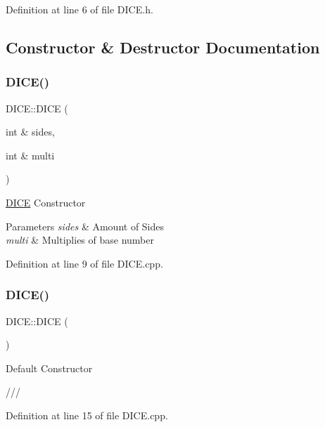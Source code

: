 Definition at line 6 of file D\+I\+C\+E.\+h.



\subsection{Constructor \& Destructor Documentation}
\mbox{\label{class_d_i_c_e_a5b7f251c8cddf1dd2a69bd676d8558fc}} 
\subsubsection{\texorpdfstring{DICE()}{DICE()}\hspace{0.1cm}{\footnotesize\ttfamily [1/2]}}
{\footnotesize\ttfamily D\+I\+C\+E\+::\+D\+I\+CE (\begin{DoxyParamCaption}\item[{int \&}]{sides,  }\item[{int \&}]{multi }\end{DoxyParamCaption})}



\mbox{\hyperlink{class_d_i_c_e}{D\+I\+CE}} Constructor 


\begin{DoxyParams}{Parameters}
{\em sides} & Amount of Sides\\
\hline
{\em multi} & Multiplies of base number\\
\hline
\end{DoxyParams}


Definition at line 9 of file D\+I\+C\+E.\+cpp.

\mbox{\label{class_d_i_c_e_a28a0c7af0af5491406de1d088b8d76f3}} 
\subsubsection{\texorpdfstring{DICE()}{DICE()}\hspace{0.1cm}{\footnotesize\ttfamily [2/2]}}
{\footnotesize\ttfamily D\+I\+C\+E\+::\+D\+I\+CE (\begin{DoxyParamCaption}{ }\end{DoxyParamCaption})}



Default Constructor 

/// 

Definition at line 15 of file D\+I\+C\+E.\+cpp.

